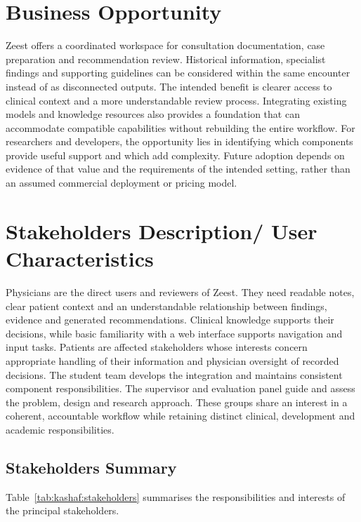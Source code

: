 \section{Business Opportunity}

Zeest offers a coordinated workspace for consultation documentation, case preparation and recommendation review. Historical information, specialist findings and supporting guidelines can be considered within the same encounter instead of as disconnected outputs. The intended benefit is clearer access to clinical context and a more understandable review process. Integrating existing models and knowledge resources also provides a foundation that can accommodate compatible capabilities without rebuilding the entire workflow. For researchers and developers, the opportunity lies in identifying which components provide useful support and which add complexity. Future adoption depends on evidence of that value and the requirements of the intended setting, rather than an assumed commercial deployment or pricing model.

\section{Stakeholders Description/ User Characteristics}

Physicians are the direct users and reviewers of Zeest. They need readable notes, clear patient context and an understandable relationship between findings, evidence and generated recommendations. Clinical knowledge supports their decisions, while basic familiarity with a web interface supports navigation and input tasks. Patients are affected stakeholders whose interests concern appropriate handling of their information and physician oversight of recorded decisions. The student team develops the integration and maintains consistent component responsibilities. The supervisor and evaluation panel guide and assess the problem, design and research approach. These groups share an interest in a coherent, accountable workflow while retaining distinct clinical, development and academic responsibilities.

\subsection{Stakeholders Summary}

Table~\ref{tab:kashaf:stakeholders} summarises the responsibilities and interests of the principal stakeholders.

